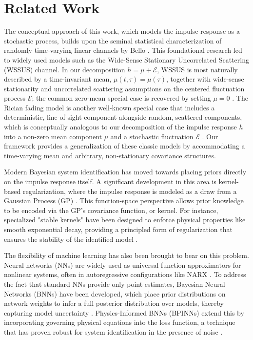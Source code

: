 \documentclass[preprint,1p,times,authoryear]{elsarticle}
\begin{document}
\section{Related Work}

The conceptual approach of this work, which models the impulse response as a stochastic process, builds upon the seminal statistical characterization of randomly time-varying linear channels by Bello \citep{Bello1963}. This foundational research led to widely used models such as the Wide-Sense Stationary Uncorrelated Scattering (WSSUS) channel. In our decomposition $h=\mu+\mathcal{E}$, WSSUS is most naturally described by a time-invariant mean, $\mu(t,\tau)=\mu(\tau)$, together with wide-sense stationarity and uncorrelated scattering assumptions on the centered fluctuation process $\mathcal{E}$; the common zero-mean special case is recovered by setting $\mu=0$ \citep{Yoo2005}. The Rician fading model is another well-known special case that includes a deterministic, line-of-sight component alongside random, scattered components, which is conceptually analogous to our decomposition of the impulse response $h$ into a non-zero mean component $\mu$ and a stochastic fluctuation $\mathcal{E}$ \citep{SimonAlouini2005}. Our framework provides a generalization of these classic models by accommodating a time-varying mean and arbitrary, non-stationary covariance structures.

Modern Bayesian system identification has moved towards placing priors directly on the impulse response itself. A significant development in this area is kernel-based regularization, where the impulse response is modeled as a draw from a Gaussian Process (GP) \citep{Pillonetto2023, Darwish2017}. This function-space perspective allows prior knowledge to be encoded via the GP's covariance function, or kernel. For instance, specialized "stable kernels" have been designed to enforce physical properties like smooth exponential decay, providing a principled form of regularization that ensures the stability of the identified model \citep{Pillonetto2023}.

The flexibility of machine learning has also been brought to bear on this problem. Neural networks (NNs) are widely used as universal function approximators for nonlinear systems, often in autoregressive configurations like NARX \citep{Narendra1990, Nelles2020}. To address the fact that standard NNs provide only point estimates, Bayesian Neural Networks (BNNs) have been developed, which place prior distributions on network weights to infer a full posterior distribution over models, thereby capturing model uncertainty \citep{Jospin2022, Zhou2022}. Physics-Informed BNNs (BPINNs) extend this by incorporating governing physical equations into the loss function, a technique that has proven robust for system identification in the presence of noise \citep{Stock2024}.
\end{document}
